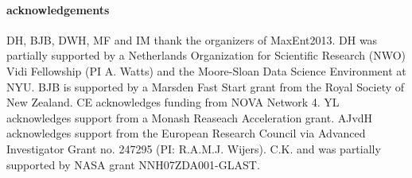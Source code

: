 \documentclass[12pt]{emulateapj}
\begin{document}
\paragraph{acknowledgements}
DH, BJB, DWH, MF and IM thank the organizers of MaxEnt2013. DH was partially supported by a Netherlands Organization for Scientific Research (NWO) Vidi Fellowship (PI A. Watts) and the Moore-Sloan Data Science Environment at NYU. BJB is supported
by a Marsden Fast Start grant from the Royal Society of New Zealand. CE acknowledges funding from NOVA Network 4. YL acknowledges support from a Monash Reaseach Acceleration grant.  AJvdH acknowledges support from the European Research Council via Advanced Investigator Grant no. 247295 (PI: R.A.M.J. Wijers).
C.K. and was partially supported by NASA grant NNH07ZDA001-GLAST.  



\end{document}
